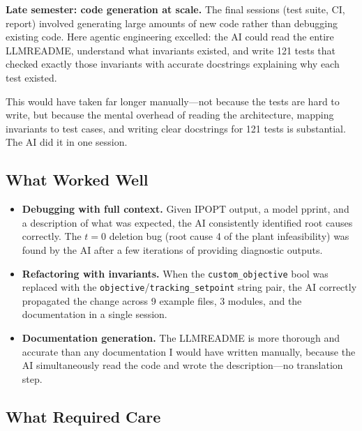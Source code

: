 \documentclass[11pt,letterpaper]{article}
\begin{document}
\textbf{Late semester: code generation at scale.} The final sessions (test suite, CI, report) involved generating large amounts of new code rather than debugging existing code. Here agentic engineering excelled: the AI could read the entire LLMREADME, understand what invariants existed, and write 121 tests that checked exactly those invariants with accurate docstrings explaining why each test existed.

This would have taken far longer manually---not because the tests are hard to write, but because the mental overhead of reading the architecture, mapping invariants to test cases, and writing clear docstrings for 121 tests is substantial. The AI did it in one session.

\subsection{What Worked Well}

\begin{itemize}[leftmargin=2em]
  \item \textbf{Debugging with full context.} Given IPOPT output, a model pprint, and a description of what was expected, the AI consistently identified root causes correctly. The $t=0$ deletion bug (root cause 4 of the plant infeasibility) was found by the AI after a few iterations of providing diagnostic outputs.
  \item \textbf{Refactoring with invariants.} When the \texttt{custom\_objective} bool was replaced with the \texttt{objective}/\texttt{tracking\_setpoint} string pair, the AI correctly propagated the change across 9 example files, 3 modules, and the documentation in a single session.
  \item \textbf{Documentation generation.} The LLMREADME is more thorough and accurate than any documentation I would have written manually, because the AI simultaneously read the code and wrote the description---no translation step.
\end{itemize}

\subsection{What Required Care}
\end{document}
